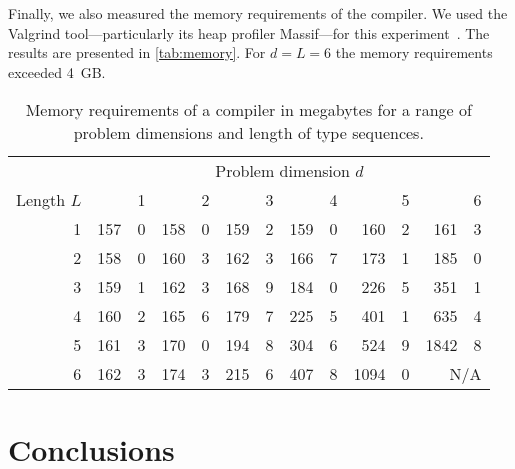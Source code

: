 \documentclass[10pt,a4paper]{article}
\theoremstyle{definition}\newtheorem{problem}{Problem}
\begin{document}
Finally, we also measured the memory requirements of the compiler. We used the Valgrind tool---particularly its heap profiler Massif---for this experiment~\cite{RefWorks:127}. The results are presented in \autoref{tab:memory}. For $d=L=6$ the memory requirements exceeded 4~GB.
\renewcommand{\arraystretch}{1.00}
\renewcommand{\tabcolsep}{3mm}
\begin{table}[t]
\caption{Memory requirements of a compiler in megabytes for a range of problem dimensions and length of type sequences.} \begin{center}
\begin{tabular}{r*{6}{r@{.}l}}
\toprule
 & \multicolumn{12}{c}{Problem dimension $d$} \\ \cmidrule(l){2-13}
Length $L$ & \multicolumn{2}{r}{1} & \multicolumn{2}{r}{2} & \multicolumn{2}{r}{3} & \multicolumn{2}{r}{4} & \multicolumn{2}{r}{5} & \multicolumn{2}{r}{6} \\ \cmidrule(r){1-1} \cmidrule(l){2-13}
1 & 157 & 0 & 158 & 0 & 159 & 2 & 159 & 0 &  160 & 2 &  161 & 3 \\
2 & 158 & 0 & 160 & 3 & 162 & 3 & 166 & 7 &  173 & 1 &  185 & 0 \\
3 & 159 & 1 & 162 & 3 & 168 & 9 & 184 & 0 &  226 & 5 &  351 & 1 \\
4 & 160 & 2 & 165 & 6 & 179 & 7 & 225 & 5 &  401 & 1 &  635 & 4 \\
5 & 161 & 3 & 170 & 0 & 194 & 8 & 304 & 6 &  524 & 9 & 1842 & 8 \\
6 & 162 & 3 & 174 & 3 & 215 & 6 & 407 & 8 & 1094 & 0 & \multicolumn{2}{r}{N/A} \\
\bottomrule
\end{tabular}
\end{center}
\label{tab:memory}
\end{table}

\section{Conclusions}
\label{sec:concl}
\end{document}
